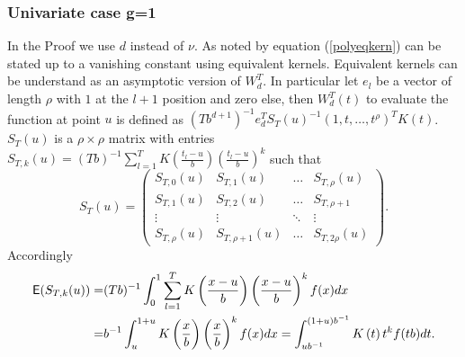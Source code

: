 \subsubsection{Univariate case g=1}
In the Proof we use $d$ instead of $\nu$. 
As noted by \cite{Ruppert:94} equation (\ref{polyeqkern}) can be stated up to a vanishing constant using equivalent kernels. Equivalent kernels can be understand as an asymptotic version of $W^T_d$. In particular let $e_l$ be a vector of length $\rho$ with $1$ at the $l+1$ position and zero else, then $W^T_d(t)$ to evaluate the function at point $u$ is defined as $(T b^{d+1}) ^{-1} e_d^T S_T(u)^{-1}(1,t,\dots, t^\rho)^T  K(t)$. $S_T(u)$ is a $\rho \times \rho$  matrix with entries $S_{T,k}(u)= (Tb)^{-1} \sum_{l=1}^{T} K\left( \frac{t_l-u}{b} \right) (\frac{t_l-u}{b})^k$  such that
\begin{equation}
\label{STMat}
S_T(u)=
\begin{pmatrix}
S_{T,0}(u)	& S_{T,1}(u)	& \dots	 & S_{T,\rho}(u)      \\
S_{T,1}(u)	& S_{T,2}(u) 	& \dots  & S_{T,\rho+1} 	  \\
\vdots	& \vdots 	& \ddots & \vdots \\
S_{T,\rho}(u)	& S_{T,\rho+1}(u)	& \dots	 & S_{T,2\rho}(u)
\end{pmatrix}.
\end{equation} 
Accordingly 
\begin{equation}
\begin{split}
\mathop{\mbox{\sf E}} ( S_{T,k}(u) ) =& (Tb)^{-1}  \int_0^1 \sum_{l=1}^{T} K\left( \frac{x-u}{b} \right) \left(\frac{x-u}{b} \right)^k f(x) dx \\
=& b^{-1}\int_u^{1+u}  K\left( \frac{x}{b} \right) \left(\frac{x}{b} \right)^k f(x) dx = \int_{ub^{-1}}^{(1+u)b^{-1}} K\left(t \right)  t^k f(tb) dt.
\end{split}
\end{equation}

